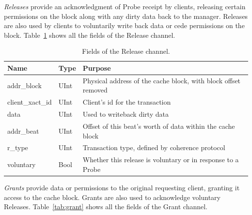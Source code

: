 
\emph{Releases} provide an acknowledgment of Probe receipt by clients, releasing certain permissions on the block along with any dirty data back to the manager.
Releases are also used by clients to voluntarily write back data or cede permissions on the block.
Table~\ref{tab:release} shows all the fields of the Release channel.


\begin{table}[]
\begin{center}
\begin{tabular}{|l|l|l|}
    \hline
    Name & Type & Purpose \\ \hline \hline
addr\_block & UInt & Physical address of the cache block, with block offset removed \\ \hline
client\_xact\_id & UInt & Client's id for the transaction \\ \hline
data & UInt & Used to writeback dirty data \\ \hline
addr\_beat & UInt & Offset of this beat's worth of data within the cache block \\ \hline
r\_type & UInt & Transaction type, defined by coherence protocol \\ \hline
voluntary & Bool & Whether this release is voluntary or in response to a Probe \\ \hline
\end{tabular}
\end{center}
\caption{Fields of the Release channel.}
\label{tab:release}
\end{table}


\emph{Grants} provide data or permissions to the original requesting client, granting it access to the cache block.
Grants are also used to acknowledge voluntary Releases.
Table~\ref{tab:grant} shows all the fields of the Grant channel.

